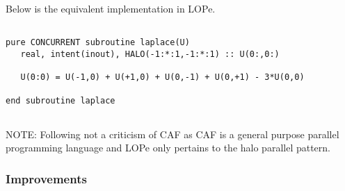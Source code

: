 Below is the equivalent implementation in LOPe.


{\small
\begin{verbatim}

pure CONCURRENT subroutine laplace(U)
   real, intent(inout), HALO(-1:*:1,-1:*:1) :: U(0:,0:)

   U(0:0) = U(-1,0) + U(+1,0) + U(0,-1) + U(0,+1) - 3*U(0,0)

end subroutine laplace


\end{verbatim}
}

NOTE: Following not a criticism of CAF as CAF is a general purpose parallel
programming language and LOPe only pertains to the halo parallel pattern.

\subsubsection{Improvements}
